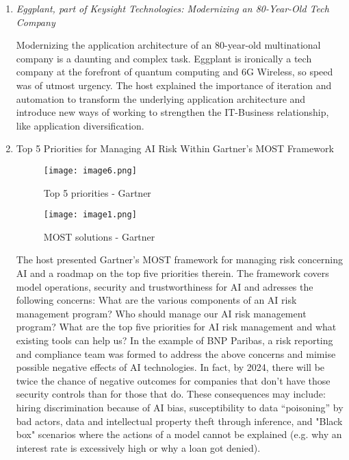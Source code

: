 \begin{enumerate}
    \item \color{dgreen} \textit{Eggplant, part of Keysight Technologies: Modernizing an 80-Year-Old Tech Company}
    
    \color{black} Modernizing the application architecture of an 80-year-old multinational company is a daunting and complex task. Eggplant is ironically a tech company at the forefront of quantum computing and 6G Wireless, so speed was of utmost urgency. The host explained the importance of iteration and automation to transform the underlying application architecture and introduce new ways of working to strengthen the IT-Business relationship, like application diversification.

    \item \color{dgreen} Top 5 Priorities for Managing AI Risk Within Gartner’s MOST Framework

    \begin{figure}[H]
        \centering
        \begin{minipage}[b]{0.49\textwidth}
          \texttt{[image: image6.png]}
          \caption*{Top 5 priorities - Gartner}
        \end{minipage}
        \hfill
        \begin{minipage}[b]{0.49\textwidth}
          \texttt{[image: image1.png]}
          \caption*{MOST solutions - Gartner}
        \end{minipage}
    \end{figure}
    
    \color{black} The host presented Gartner's MOST framework for managing risk concerning AI and a roadmap on the top five priorities therein. The framework covers model operations, security and trustworthiness for AI and adresses the following concerns: What are the various components of an AI risk management program? Who should manage our AI risk management program? What are the top five priorities for AI risk management and what existing tools can help us? In the example of BNP Paribas, a risk reporting and compliance team was formed to address the above concerns and mimise possible negative effects of AI technologies. In fact, by 2024, there will be twice the chance of negative outcomes for companies that don't have those security controls than for those that do. These consequences may include: hiring discrimination because of AI bias, susceptibility to data “poisoning” by bad actors, data and intellectual property theft through inference, and "Black box" scenarios where the actions of a model cannot be explained (e.g. why an interest rate is excessively high or why a loan got denied).


\end{enumerate}
